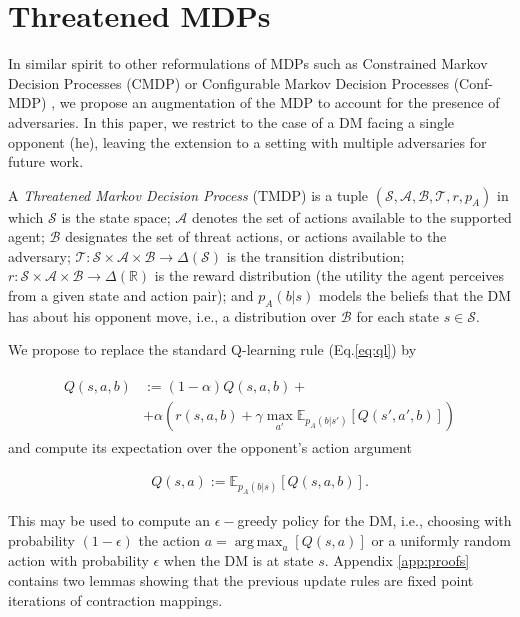 \documentclass[letterpaper]{article} %
\DeclareMathOperator*{\argmax}{arg\,max}
\begin{document}
\section{Threatened MDPs}

In similar spirit to other reformulations of MDPs such as Constrained Markov Decision Processes (CMDP) \cite{altman1999constrained} or Configurable Markov Decision Processes (Conf-MDP) \cite{2018arXiv180605415M}, we propose an augmentation of the MDP
to account for the presence of adversaries. In this paper, we restrict to the case of a DM facing a single opponent (he), leaving the extension to 
a setting with multiple adversaries for future work.

A \emph{Threatened Markov Decision Process} (TMDP) is a tuple $\left( \mathcal{S}, \mathcal{A}, \mathcal{B}, \mathcal{T}, r, p_A \right) $ 
in which $\mathcal{S}$ is the state space; $\mathcal{A}$ denotes the set of actions available to the supported agent; $\mathcal{B}$ designates the set of threat actions, or actions
available to the adversary; $\mathcal{T}: \mathcal{S} \times \mathcal{A} \times \mathcal{B} \rightarrow \Delta(\mathcal{S})$ is the transition distribution; 
$r : \mathcal{S} \times \mathcal{A} \times \mathcal{B} \rightarrow \Delta(\mathbb{R}) $ is the reward distribution (the utility the agent perceives from a given state
and action pair);  and $p_A (b | s)$ models the beliefs that the DM has about
his opponent move, i.e., a distribution over $\mathcal{B}$ for each state $s \in \mathcal{S}$.

We propose to replace the standard Q-learning rule (Eq.\ref{eq:ql})  by 

\begin{align}\label{eq:lr}
\begin{split}
Q(s, a, b) &:= (1 - \alpha)Q(s, a, b) + \\ &+ \alpha \left( r(s,a,b) + \gamma \max_{a'} \mathbb{E}_{p_A(b|s')} \left[ Q(s',a',b)  \right]  \right)
\end{split}
\end{align}
and compute its expectation over the opponent's action argument

\begin{align}
Q(s,a) := \mathbb{E}_{p_A(b|s)} \left[ Q(s,a,b) \right].
\end{align}

This may be used to compute an $\epsilon-$greedy policy for the DM, i.e., choosing
with probability $(1-\epsilon)$ the action $a = \argmax_a  \left[ Q(s,a)  \right] $ or a uniformly random action with probability $\epsilon$ when 
the DM is at state $s$. 
Appendix \ref{app:proofs} contains two lemmas showing
that the previous update rules are fixed point iterations of contraction mappings.
\end{document}
